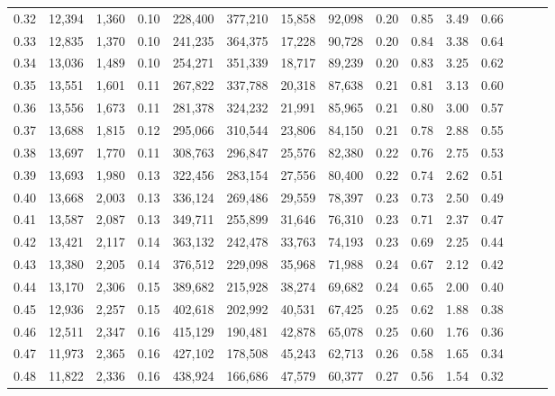 \begin{tabular}{rrrrrrrrrrrrrrr}
0.32 &  12,394 &  1,360 &  0.10 &  228,400 &  377,210 &   15,858 &   92,098 &  0.20 &  0.85 &  3.49 &      0.66 \\
0.33 &  12,835 &  1,370 &  0.10 &  241,235 &  364,375 &   17,228 &   90,728 &  0.20 &  0.84 &  3.38 &      0.64 \\
0.34 &  13,036 &  1,489 &  0.10 &  254,271 &  351,339 &   18,717 &   89,239 &  0.20 &  0.83 &  3.25 &      0.62 \\
0.35 &  13,551 &  1,601 &  0.11 &  267,822 &  337,788 &   20,318 &   87,638 &  0.21 &  0.81 &  3.13 &      0.60 \\
0.36 &  13,556 &  1,673 &  0.11 &  281,378 &  324,232 &   21,991 &   85,965 &  0.21 &  0.80 &  3.00 &      0.57 \\
0.37 &  13,688 &  1,815 &  0.12 &  295,066 &  310,544 &   23,806 &   84,150 &  0.21 &  0.78 &  2.88 &      0.55 \\
0.38 &  13,697 &  1,770 &  0.11 &  308,763 &  296,847 &   25,576 &   82,380 &  0.22 &  0.76 &  2.75 &      0.53 \\
0.39 &  13,693 &  1,980 &  0.13 &  322,456 &  283,154 &   27,556 &   80,400 &  0.22 &  0.74 &  2.62 &      0.51 \\
0.40 &  13,668 &  2,003 &  0.13 &  336,124 &  269,486 &   29,559 &   78,397 &  0.23 &  0.73 &  2.50 &      0.49 \\
0.41 &  13,587 &  2,087 &  0.13 &  349,711 &  255,899 &   31,646 &   76,310 &  0.23 &  0.71 &  2.37 &      0.47 \\
0.42 &  13,421 &  2,117 &  0.14 &  363,132 &  242,478 &   33,763 &   74,193 &  0.23 &  0.69 &  2.25 &      0.44 \\
0.43 &  13,380 &  2,205 &  0.14 &  376,512 &  229,098 &   35,968 &   71,988 &  0.24 &  0.67 &  2.12 &      0.42 \\
0.44 &  13,170 &  2,306 &  0.15 &  389,682 &  215,928 &   38,274 &   69,682 &  0.24 &  0.65 &  2.00 &      0.40 \\
0.45 &  12,936 &  2,257 &  0.15 &  402,618 &  202,992 &   40,531 &   67,425 &  0.25 &  0.62 &  1.88 &      0.38 \\
0.46 &  12,511 &  2,347 &  0.16 &  415,129 &  190,481 &   42,878 &   65,078 &  0.25 &  0.60 &  1.76 &      0.36 \\
0.47 &  11,973 &  2,365 &  0.16 &  427,102 &  178,508 &   45,243 &   62,713 &  0.26 &  0.58 &  1.65 &      0.34 \\
0.48 &  11,822 &  2,336 &  0.16 &  438,924 &  166,686 &   47,579 &   60,377 &  0.27 &  0.56 &  1.54 &      0.32 \\

\end{tabular}
